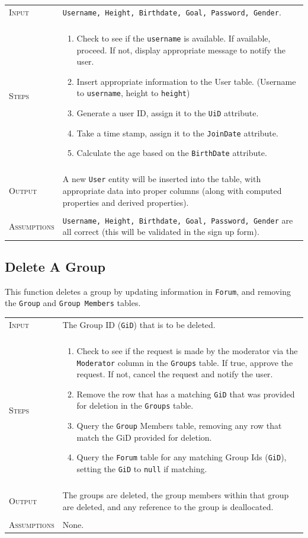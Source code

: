 \documentclass{article}
\newcommand{\br}{\multicolumn{2}{c}{} \\}
\begin{document}
\noindent
\begin{tabular}{l|p{9.5cm}}
\textsc{Input} & \texttt{Username, Height, Birthdate, Goal, Password, Gender}. \\
\br
\textsc{Steps} & \begin{enumerate}[topsep=0pt]
\item Check to see if the \texttt{username} is available. If available, proceed. If not, display appropriate message to notify the user.
\item Insert appropriate information to the User table. (Username to \texttt{username}, height to \texttt{height})
\item Generate a user ID, assign it to the \texttt{UiD} attribute.
\item Take a time stamp, assign it to the \texttt{JoinDate} attribute.
\item Calculate the age based on the \texttt{BirthDate} attribute.
\end{enumerate}
\\
\br
\textsc{Output} & A new \texttt{User} entity will be inserted into the table, with appropriate data into proper columns (along with computed properties and derived properties).\\
\br
\textsc{Assumptions} &\texttt{Username, Height, Birthdate, Goal, Password, Gender} are all correct (this will be validated in the sign up form).
\end{tabular}

\subsection*{Delete A Group}
This function deletes a group by updating information in \texttt{Forum}, and removing the \texttt{Group} and \texttt{Group Members} tables. \\

\noindent
\begin{tabular}{l|p{9.5cm}}
\textsc{Input} & The Group ID (\texttt{GiD}) that is to be deleted. \\
\br
\textsc{Steps} & \begin{enumerate}[topsep=0pt]
\item Check to see if the request is made by the moderator via the \texttt{Moderator} column in the \texttt{Groups} table. If true, approve the request. If not, cancel the request and notify the user.
\item Remove the row that has a matching \texttt{GiD} that was provided for deletion in the \texttt{Groups} table.
\item Query the \texttt{Group} Members table, removing any row that match the GiD provided for deletion.
\item Query the \texttt{Forum} table for any matching Group Ids (\texttt{GiD}), setting the \texttt{GiD} to \texttt{null} if matching.
\end{enumerate}
\\
\br
\textsc{Output} & The groups are deleted, the group members within that group are deleted, and any reference to the group is deallocated. \\
\br
\textsc{Assumptions} & None.
\end{tabular}
\end{document}
